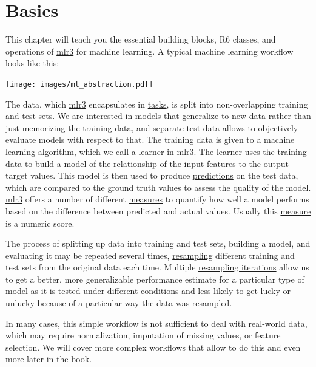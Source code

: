 \documentclass[]{article}
\begin{document}
\hypertarget{basics}{%
\section{Basics}\label{basics}}

This chapter will teach you the essential building blocks, R6 classes, and operations of \href{https://mlr3.mlr-org.com}{mlr3} for machine learning.
A typical machine learning workflow looks like this:

\texttt{[image: images/ml\_abstraction.pdf]}

The data, which \href{https://mlr3.mlr-org.com}{mlr3} encapsulates in \protect\hyperlink{tasks}{tasks}, is split into non-overlapping training and test sets.
We are interested in models that generalize to new data rather than just memorizing the training data, and separate test data allows to objectively evaluate models with respect to that.
The training data is given to a machine learning algorithm, which we call a \protect\hyperlink{learners}{learner} in \href{https://mlr3.mlr-org.com}{mlr3}.
The \protect\hyperlink{learners}{learner} uses the training data to build a model of the relationship of the input features to the output target values.
This model is then used to produce \protect\hyperlink{predicting}{predictions} on the test data, which are compared to the ground truth values to assess the quality of the model.
\href{https://mlr3.mlr-org.com}{mlr3} offers a number of different \protect\hyperlink{measure}{measures} to quantify how well a model performs based on the difference between predicted and actual values.
Usually this \protect\hyperlink{measure}{measure} is a numeric score.

The process of splitting up data into training and test sets, building a model, and evaluating it may be repeated several times, \protect\hyperlink{resampling}{resampling} different training and test sets from the original data each time.
Multiple \protect\hyperlink{resampling}{resampling iterations} allow us to get a better, more generalizable performance estimate for a particular type of model as it is tested under different conditions and less likely to get lucky or unlucky because of a particular way the data was resampled.

In many cases, this simple workflow is not sufficient to deal with real-world data, which may require normalization, imputation of missing values, or feature selection.
We will cover more complex workflows that allow to do this and even more later in the book.
\end{document}
